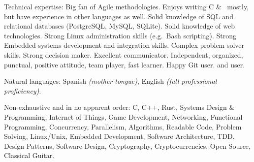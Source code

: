 \documentclass[10pt,a4paper]{article}
\begin{document}
\spacedhrule{0.5em}{-0.4em}


\inlineheadsection  %
{Technical expertise:}
{Big fan of Agile methodologies. Enjoys writing C \& \nsp\CPP\nsp\, mostly, but have experience in other languages as well. Solid knowledge of SQL and relational databases (PostgreSQL, MySQL, SQLite). Solid knowledge of web technologies. Strong Linux administration skills (e.g.\ Bash scripting). Strong Embedded systems development and integration skills. Complex problem solver skills. Strong decision maker. Excellent communicator. Independent, organized, punctual, positive attitude, team player, fast learner. Happy Git user.  and  user.}

\vspace{0.5em}
\inlineheadsection
{Natural languages:}
{Spanish \emph{(mother tongue)}, English \emph{(full professional proficiency)}.}

\spacedhrule{1.6em}{-0.4em}


\inlineheadsection
{Non-exhaustive and in no apparent order:}
{C, C++, Rust, Systems Design \& Programming, Internet of Things, Game Development, Networking, Functional Programming, Concurrency, Parallelism, Algorithms, Readable Code, Problem Solving, Linux/Unix, Embedded Development, Software Architecture, TDD, Design Patterns, Software Design, Cryptography, Cryptocurrencies, Open Source, Classical Guitar.}
\end{document}
